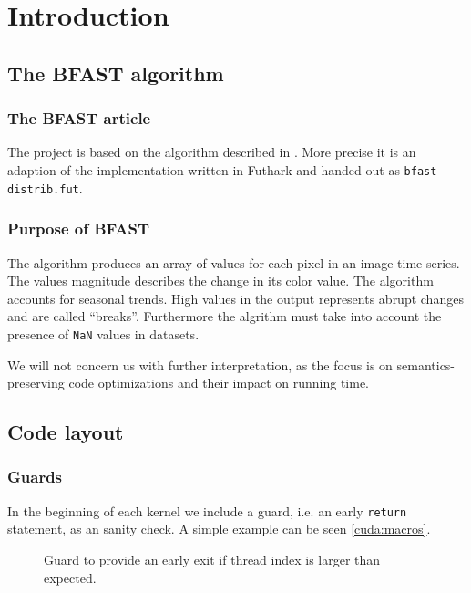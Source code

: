 \section{Introduction}

\subsection{The \textsc{BFAST} algorithm}
\subsubsection{The \textsc{BFAST} article}
The project is based on the algorithm described in \cite{bfast}. More precise it
is an adaption of the implementation written in Futhark and handed out as
\texttt{bfast-distrib.fut}.

\subsubsection{Purpose of \textsc{BFAST}}
The algorithm produces an array of values for each pixel in an image time
series. The values magnitude describes the change in its color value. The algorithm accounts
for seasonal trends. High values in the output represents abrupt changes and are
called \enquote{breaks}.
Furthermore the algrithm must take into account the presence of \texttt{NaN}
values in datasets.

We will not concern us with further interpretation, as the focus is on
semantics-preserving code optimizations and their impact on running time.

\subsection{Code layout}

\subsubsection{Guards} In the beginning of each kernel we include a guard, i.e.
an early \texttt{return} statement, as an sanity check. A simple example can be
seen \autoref{cuda:macros}.

\begin{figure}[H]
    \centering
    \caption{Guard to provide an early exit if thread index is larger than expected.}
    \label{cuda:macros}
\end{figure}

